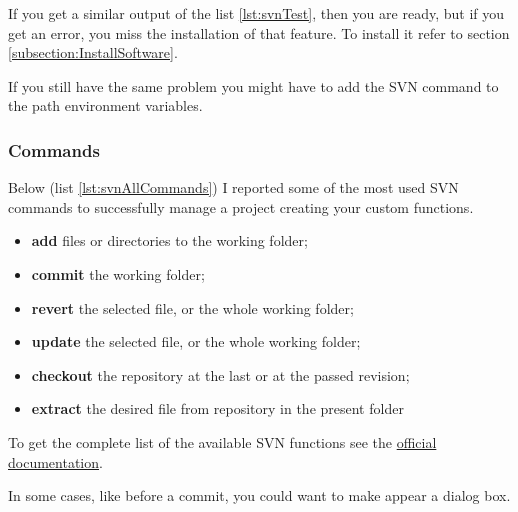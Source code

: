If you get a similar output of the list \ref{lst:svnTest}, then you are ready, but if you get an error, you miss the installation of that feature. To install it refer to section \ref{subsection:InstallSoftware}.

If you still have the same problem you might have to add the SVN command to the path environment variables.

\subsubsection{Commands}

Below (list \ref{lst:svnAllCommands}) I reported some of the most used SVN commands to successfully manage a project creating your custom functions.

\begin{itemize}

\item \textbf{add} files or directories to the working folder;

\item \textbf{commit} the working folder;

\item \textbf{revert} the selected file, or the whole working folder;

\item \textbf{update} the selected file, or the whole working folder;

\item \textbf{checkout} the repository at the last or at the passed revision;

\item \textbf{extract} the desired file from repository in the present folder

\end{itemize}

To get the complete list of the available SVN functions see the \href{http://svnbook.red-bean.com/en/1.7/svn.ref.html}{official documentation}.



In some cases, like before a commit, you could want to make appear a dialog box.

